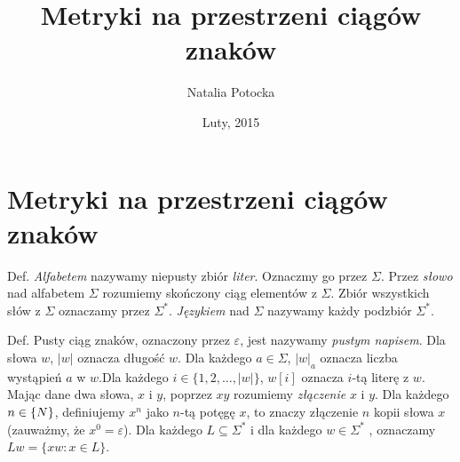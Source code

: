 \documentclass[]{article}
\title{Metryki na przestrzeni ciągów znaków}
\author{Natalia Potocka}
\date{Luty, 2015}
\begin{document}
\maketitle


\section{Metryki na przestrzeni ciągów
znaków}\label{metryki-na-przestrzeni-ciagow-znakow}

Def. \emph{Alfabetem} nazywamy niepusty zbiór \emph{liter}. Oznaczmy go
przez $\Sigma$. Przez \emph{słowo} nad alfabetem $\Sigma$ rozumiemy
skończony ciąg elementów z $\Sigma$. Zbiór wszystkich słów z $\Sigma$
oznaczamy przez $\Sigma^*$. \emph{Językiem} nad $\Sigma$ nazywamy każdy
podzbiór $\Sigma^*$.

Def. Pusty ciąg znaków, oznaczony przez $\varepsilon$, jest nazywamy
\emph{pustym napisem}. Dla słowa $w$, $|w|$ oznacza długość $w$. Dla
każdego $a \in \Sigma$, $|w|_a$ oznacza liczba wystąpień $a$ w $w$.Dla
każdego $i \in \{1,2, \ldots, |w|\}$, $w[i]$ oznacza $i$-tą literę z
$w$. Mając dane dwa słowa, $x$ i $y$, poprzez $xy$ rozumiemy
\emph{złączenie} $x$ i $y$. Dla każdego $n \in \mathbb\{N\}$,
definiujemy $x^n$ jako $n$-tą potęgę $x$, to znaczy złączenie $n$ kopii
słowa $x$ (zauważmy, że $x^0=\varepsilon$). Dla każdego
$L \subseteq \Sigma^*$ i dla każdego $w \in \Sigma^*$ , oznaczamy
$Lw = \{xw: x \in L\}$.
\end{document}
